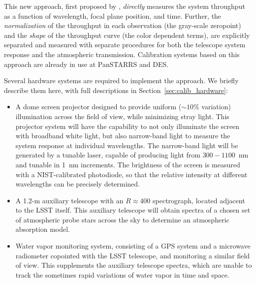 \documentclass[12pt,preprint]{aastex}
\begin{document}
This new approach, first proposed by \citep{StubbsTonry2006}, 
{\it directly} measures the system throughput as a function of wavelength, 
focal plane position, and time.  Further, the {\it
normalization} of the throughput in each observation (the gray-scale
zeropoint) and the {\it shape} of the throughput curve (the color
dependent terms), are explicitly separated and measured with separate procedures
for both the telescope system response and the atmospheric transmission. 
Calibration systems based on this approach are already in use at PanSTARRS and DES. 

\noindent
Several hardware systems are required to implement the approach. We briefly
describe them here, with full descriptions in Section~\ref{sec:calib_hardware}:

\begin{itemize}
\item{A dome screen projector designed to provide uniform
    ($\sim10\%$ variation) illumination across the field of view, while
    minimizing stray light. This projector system will have the
    capability to not only illuminate the screen with broadband white
    light, but also narrow-band light to measure the system response
    at individual wavelengths. The narrow-band light will be generated
    by a tunable laser, capable of producing light from $300-1100$~nm
    and tunable in 1~nm increments. The brightness of the screen is measured 
    with a NIST-calibrated photodiode, so that the relative intensity at different 
    wavelengths can be precisely determined. } 
\item{A 1.2-m auxiliary telescope with an $R \approx 400$ spectrograph,
    located adjacent to the LSST itself. This auxiliary telescope will
    obtain spectra of a chosen set of atmospheric probe stars across the sky to
    determine an atmospheric absorption model.} 
\item{Water vapor monitoring system, consisting of a GPS system and a 
    microwave radiometer copointed with the LSST telescope, and monitoring 
    a similar field of view.  This supplements the auxiliary telescope spectra, which are
    unable to track the sometimes rapid variations of water vapor in time and space.}  
\end{itemize}
\end{document}
